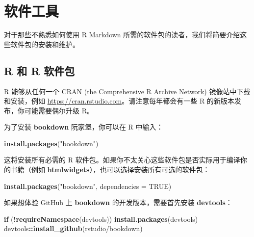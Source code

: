 \documentclass[
  12pt,
]{krantz}
\newenvironment{Shaded}{\begin{snugshade}}{\end{snugshade}}
\newcommand{\AttributeTok}[1]{\textcolor[rgb]{0.13,0.29,0.53}{#1}}
\newcommand{\ConstantTok}[1]{\textcolor[rgb]{0.56,0.35,0.01}{#1}}
\newcommand{\ControlFlowTok}[1]{\textcolor[rgb]{0.13,0.29,0.53}{\textbf{#1}}}
\newcommand{\FunctionTok}[1]{\textcolor[rgb]{0.13,0.29,0.53}{\textbf{#1}}}
\newcommand{\NormalTok}[1]{#1}
\newcommand{\SpecialCharTok}[1]{\textcolor[rgb]{0.81,0.36,0.00}{\textbf{#1}}}
\newcommand{\StringTok}[1]{\textcolor[rgb]{0.31,0.60,0.02}{#1}}
\theoremstyle{definition}
\theoremstyle{definition}
\theoremstyle{definition}
\theoremstyle{definition}
\theoremstyle{remark}
\begin{document}
\cleardoublepage

\hypertarget{appendix-ux9644ux5f55}{%
\appendix {}}


\hypertarget{software-tools}{%
\chapter{软件工具}\label{software-tools}}

对于那些不熟悉如何使用 R Markdown 所需的软件包的读者，我们将简要介绍这些软件包的安装和维护。

\hypertarget{r-ux548c-r-ux8f6fux4ef6ux5305}{%
\section{R 和 R 软件包}\label{r-ux548c-r-ux8f6fux4ef6ux5305}}

R 能够从任何一个 CRAN (the Comprehensive R Archive Network) 镜像站中下载和安装，例如 \url{https://cran.rstudio.com}。请注意每年都会有一些 R 的新版本发布，你可能需要偶尔升级 R。

为了安装 \textbf{bookdown} 阮家堡，你可以在 R 中输入：

\begin{Shaded}
\begin{Highlighting}[]
\FunctionTok{install.packages}\NormalTok{(}\StringTok{"bookdown"}\NormalTok{)}
\end{Highlighting}
\end{Shaded}

这将安装所有必需的 R 软件包。如果你不太关心这些软件包是否实际用于编译你的书籍（例如 \textbf{htmlwidgets}），也可以选择安装所有可选的软件包：

\begin{Shaded}
\begin{Highlighting}[]
\FunctionTok{install.packages}\NormalTok{(}\StringTok{"bookdown"}\NormalTok{, }\AttributeTok{dependencies =} \ConstantTok{TRUE}\NormalTok{)}
\end{Highlighting}
\end{Shaded}

如果想体验 GitHub 上 \textbf{bookdown} 的开发版本，需要首先安装 \textbf{devtools}：

\begin{Shaded}
\begin{Highlighting}[]
\ControlFlowTok{if}\NormalTok{ (}\SpecialCharTok{!}\FunctionTok{requireNamespace}\NormalTok{(}\StringTok{\textquotesingle{}devtools\textquotesingle{}}\NormalTok{)) }\FunctionTok{install.packages}\NormalTok{(}\StringTok{\textquotesingle{}devtools\textquotesingle{}}\NormalTok{)}
\NormalTok{devtools}\SpecialCharTok{::}\FunctionTok{install\_github}\NormalTok{(}\StringTok{\textquotesingle{}rstudio/bookdown\textquotesingle{}}\NormalTok{)}
\end{Highlighting}
\end{Shaded}
\end{document}
